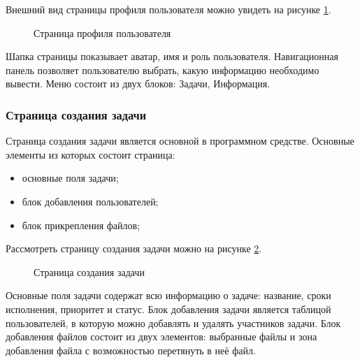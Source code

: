 Внешний вид страницы профиля пользователя можно увидеть на рисунке \ref{fig:profile}.

\begin{figure}[ht]
    \centering
    \caption{Страница профиля пользователя}
    \label{fig:profile}
\end{figure}

Шапка страницы показывает аватар, имя и роль пользователя. Навигационная панель позволяет пользователю выбрать, какую информацию
необходимо вывести. Меню состоит из двух блоков: Задачи, Информация.

\subsubsection{Страница создания задачи}

Страница создания задачи является основной в программном средстве. Основные элементы из которых состоит страница:
\begin{itemize}
    \item основные поля задачи;
    \item блок добавления пользователей;
    \item блок прикрепления файлов;
\end{itemize}

Рассмотреть страницу создания задачи можно на рисунке \ref{fig:task}.

\begin{figure}[ht]
    \centering
    \caption{Страница создания задачи}
    \label{fig:task}
\end{figure}

Основные поля задачи содержат всю информацию о задаче: название, сроки исполнения, приоритет и статус. Блок добавления задачи является
таблицой пользователей, в которую можно добавлять и удалять участников задачи. Блок добавления файлов состоит из двух элементов: выбранные
файлы и зона добавления файла с возможностью перетянуть в неё файл.